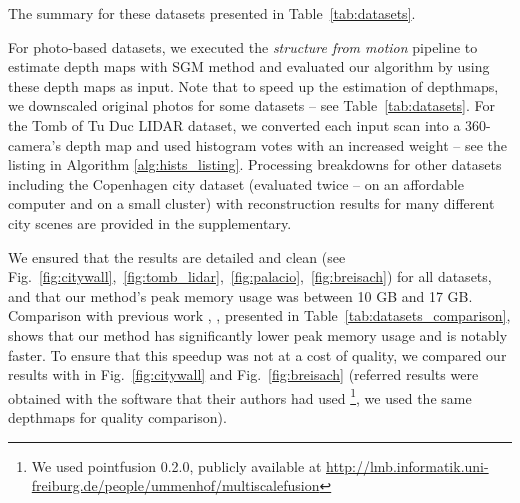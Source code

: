 \documentclass[10pt,twocolumn,letterpaper]{article}
\begin{document}
The summary for these datasets presented in Table~\ref{tab:datasets}.

For photo-based datasets, we executed the \textit{structure from motion} pipeline to estimate depth maps with SGM \cite{hirschmuller2007stereo}
method and evaluated our algorithm by using these depth maps as input. Note that to speed up the estimation of depthmaps, we downscaled original photos for some datasets -- see Table~\ref{tab:datasets}.
For the Tomb of Tu Duc LIDAR dataset, we converted each input scan into a 360-camera's depth map and used histogram votes with an increased weight -- see the listing in Algorithm \ref{alg:hists_listing}.
Processing breakdowns for other datasets including the Copenhagen city dataset (evaluated twice -- on an affordable computer and on a small cluster) with reconstruction results for many different city scenes are provided in the supplementary.

We ensured that the results are detailed and clean (see Fig.~\ref{fig:citywall},~\ref{fig:tomb_lidar},~\ref{fig:palacio},~\ref{fig:breisach}) for all datasets, and that our method's peak memory usage was between 10 GB and 17 GB.
Comparison with previous work \cite{ummenhofer2015global}, \cite{mostegel2017scalable}, presented in Table~\ref{tab:datasets_comparison}, shows that our method has significantly lower peak memory usage and is notably faster.
To ensure that this speedup was not at a cost of quality, we compared our results with  \cite{ummenhofer2015global} in Fig.~\ref{fig:citywall} and Fig.~\ref{fig:breisach}
(referred results were obtained with the software that their authors had used \footnote{We used pointfusion 0.2.0, publicly available at \url{http://lmb.informatik.uni-freiburg.de/people/ummenhof/multiscalefusion}}, we used the same depthmaps for quality comparison).
\end{document}
